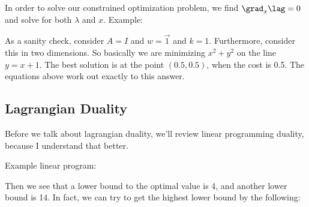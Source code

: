 \documentclass[12pt]{article}
\begin{document}
In order to solve our constrained optimization problem, we find $\grad_x \lag = 0$ and solve for both $\lambda$ and $x$. Example:


As a sanity check, consider $A = I$ and $w = \vec 1$ and $k = 1$. Furthermore, consider this in two dimensions. So basically we are minimizing $x^2 + y^2$ on the line $y = x+1$. The best solution is at the point $(0.5, 0.5)$, when the cost is 0.5. The equations above work out exactly to this answer.

\subsection{Lagrangian Duality}

Before we talk about lagrangian duality, we'll review linear programming duality, because I understand that better.

Example linear program:


Then we see that a lower bound to the optimal value is 4, and another lower bound is 14. In fact, we can try to get the highest lower bound by the following:
\end{document}
